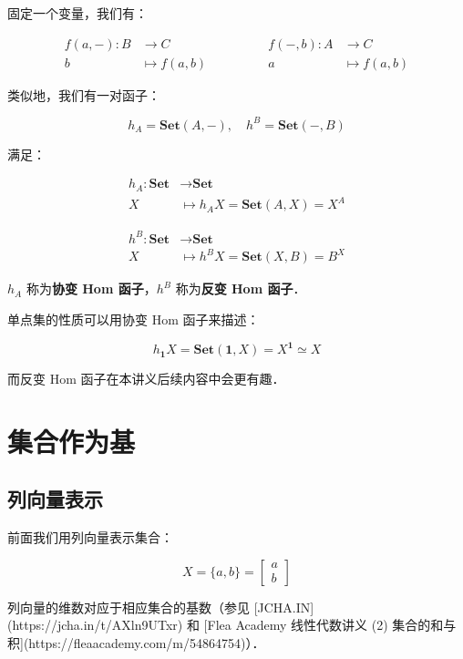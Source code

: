 \documentclass[10pt, openany]{book}
\begin{document}
固定一个变量，我们有：

$$
\begin{aligned}
f(a,-): B &\to C \\
b &\mapsto f(a,b)
\end{aligned}
\qquad\qquad
\begin{aligned}
f(-,b): A &\to C \\
a &\mapsto f(a,b)
\end{aligned}
$$

类似地，我们有一对函子：

$$
h_A = \textbf{Set}(A,-),\quad h^B = \textbf{Set}(-,B)
$$

满足：

$$
\begin{aligned}
h_A: \textbf{Set} &\to \textbf{Set} \\
X &\mapsto h_A X = \textbf{Set}(A,X) = X^A
\end{aligned}
$$

$$
\begin{aligned}
h^B: \textbf{Set} &\to \textbf{Set} \\
X &\mapsto h^B X = \textbf{Set}(X,B) = B^X
\end{aligned}
$$

$h_A$ 称为\textbf{协变 Hom 函子}，$h^B$ 称为\textbf{反变 Hom 函子}．

单点集的性质可以用协变 Hom 函子来描述：

$$
h_{\mathbf{1}} X = \textbf{Set}(\mathbf{1},X) = X^{\mathbf{1}} \simeq X
$$

而反变 Hom 函子在本讲义后续内容中会更有趣．

\chapter{集合作为基}

\section{列向量表示}

前面我们用列向量表示集合：

$$
X = \{a,b\} = \begin{bmatrix}a\\b\end{bmatrix}
$$

列向量的维数对应于相应集合的基数（参见 [JCHA.IN](https://jcha.in/t/AXln9UTxr) 和 [Flea Academy 线性代数讲义 (2) 集合的和与积](https://fleaacademy.com/m/54864754)）．
\end{document}
